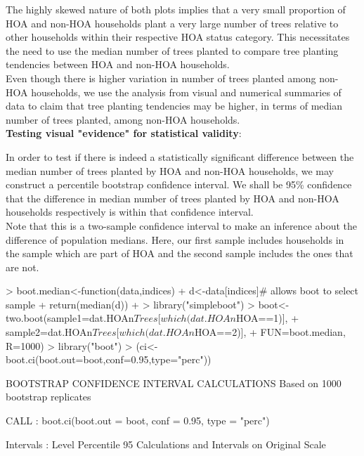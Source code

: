 \documentclass{article}
\begin{document}
The highly skewed nature of both plots implies that a very small proportion of HOA and non-HOA households plant a very large number of trees relative to other households within their respective HOA status category. This necessitates the need to use the median number of trees planted to compare tree planting tendencies between HOA and non-HOA households.\\

Even though there is higher variation in number of trees planted among non-HOA households, we use the analysis from visual and numerical summaries of data to claim that tree planting tendencies may be higher, in terms of median number of trees planted, among non-HOA households.\\

\textbf{Testing visual "evidence" for statistical validity}:

In order to test if there is indeed a statistically significant difference between the median number of trees planted by HOA and non-HOA households, we may construct a percentile bootstrap confidence interval. We shall be 95\% confidence that the difference in median number of trees planted by HOA and non-HOA households respectively is within that confidence interval.\\

Note that this is a two-sample confidence interval to make an inference about the difference of population medians. Here, our first sample includes households in the sample which are part of HOA and the second sample includes the ones that are not.\\


\begin{Schunk}
\begin{Sinput}
> boot.median<-function(data,indices){
+   d<-data[indices]# allows boot to select sample
+   return(median(d))
+ }
> library("simpleboot")
> boot<-two.boot(sample1=dat.HOAn$Trees[which(dat.HOAn$HOA==1)],
+                sample2=dat.HOAn$Trees[which(dat.HOAn$HOA==2)],
+                FUN=boot.median, R=1000)
> library("boot")
> (ci<-boot.ci(boot.out=boot,conf=0.95,type="perc"))
\end{Sinput}
\begin{Soutput}
BOOTSTRAP CONFIDENCE INTERVAL CALCULATIONS
Based on 1000 bootstrap replicates

CALL : 
boot.ci(boot.out = boot, conf = 0.95, type = "perc")

Intervals : 
Level     Percentile     
95%
Calculations and Intervals on Original Scale
\end{Soutput}
\end{Schunk}
\end{document}
